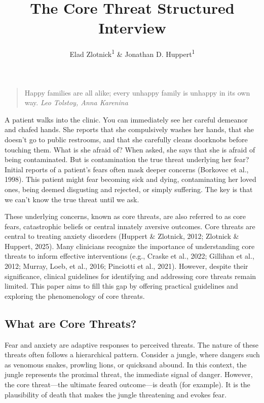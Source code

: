 \documentclass[
  man,floatsintext]{apa7}
\title{The Core Threat Structured Interview}
\author{Elad Zlotnick\textsuperscript{1} \& Jonathan D. Huppert\textsuperscript{1}}
\date{}
\affiliation{\vspace{0.5cm}\textsuperscript{1} The Hebrew University of Jerusalem}
\begin{document}
\maketitle

\begin{quote}
Happy families are all alike; every unhappy family is unhappy in its own way. \emph{Leo Tolstoy, Anna Karenina}
\end{quote}

A patient walks into the clinic.
You can immediately see her careful demeanor and chafed hands.
She reports that she compulsively washes her hands, that she doesn't go to public restrooms, and that she carefully cleans doorknobs before touching them.
What is she afraid of?
When asked, she says that she is afraid of being contaminated.
But is contamination the true threat underlying her fear?
Initial reports of a patient's fears often mask deeper concerns (Borkovec et al., 1998).
This patient might fear becoming sick and dying, contaminating her loved ones, being deemed disgusting and rejected, or simply suffering.
The key is that we can't know the true threat until we ask.

These underlying concerns, known as core threats, are also referred to as core fears, catastrophic beliefs or central innately aversive outcomes.
Core threats are central to treating anxiety disorders (Huppert \& Zlotnick, 2012; Zlotnick \& Huppert, 2025).
Many clinicians recognize the importance of understanding core threats to inform effective interventions
(e.g., Craske et al., 2022; Gillihan et al., 2012; Murray, Loeb, et al., 2016; Pinciotti et al., 2021).
However, despite their significance, clinical guidelines for identifying and addressing core threats remain limited.
This paper aims to fill this gap by offering practical guidelines and exploring the phenomenology of core threats.

\subsection{What are Core Threats?}\label{what-are-core-threats}

Fear and anxiety are adaptive responses to perceived threats.
The nature of these threats often follows a hierarchical pattern.
Consider a jungle, where dangers such as venomous snakes, prowling lions, or quicksand abound.
In this context, the jungle represents the proximal threat, the immediate signal of danger.
However, the core threat---the ultimate feared outcome---is death (for example).
It is the plausibility of death that makes the jungle threatening and evokes fear.
\end{document}
